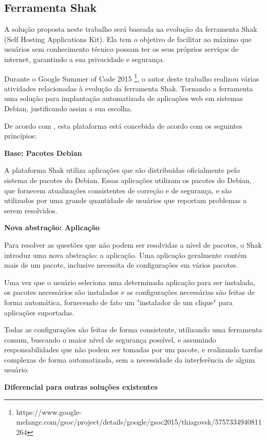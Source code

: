 \subsection{Ferramenta Shak}

A solução proposta neste trabalho será baseada na evolução da ferramenta Shak
(Self Hosting Applications Kit). Ela tem o objetivo de facilitar 
ao máximo que usuários sem conhecimento técnico possam ter os seus próprios 
serviços de internet, garantindo a sua privacidade e segurança. 

Durante o Google Summer of Code 2015 \footnote{https://www.google-melange.com/gsoc/project/details/google/gsoc2015/thiagovsk/5757334940811264}, o autor deste trabalho realizou 
várias atividades relacionadas à evolução da ferramenta Shak. Tornando a ferramenta uma
 solução para implantação automatizada de aplicações web em sistemas Debian, 
justificando assim a sua escolha.

De acordo com , esta plataforma está concebida de acordo 
com os seguintes princípios:

\textbf{Base: Pacotes Debian}

A plataforma Shak utiliza aplicações que são distribuídas oficialmente pelo 
sistema de pacotes do Debian. Essas aplicações utilizam os
pacotes do Debian, que fornecem atualizações consistentes de correção e de segurança,
e são utilizados por uma grande quantidade de usuários que reportam problemas a
serem resolvidos. 

\textbf{Nova abstração: Aplicação}

Para resolver as questões que não podem ser resolvidas a nível de pacotes, o
Shak introduz uma nova abstração: a aplicação. Uma aplicação geralmente
contém mais de um pacote, inclusive necessita de configurações em vários pacotes.

Uma vez que o usuário seleciona uma determinada aplicação para
ser instalada, os pacotes necessários são instalados e as configurações
necessárias são feitas de forma automática, fornecendo de fato um "instalador
de um clique" para aplicações suportadas. 

Todas as configurações são feitas de
forma consistente, utilizando uma ferramenta comum, buscando o maior nível de
segurança possível, e assumindo responsabilidades que não podem ser tomadas por
um pacote, e realizando tarefas complexas de forma automatizada, sem a necessidade
da interferência de algum usuário.

\textbf{Diferencial para outras soluções existentes}

